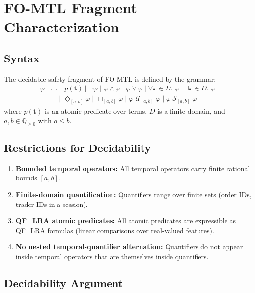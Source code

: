 \documentclass[11pt]{article}
\begin{document}
\section{FO-MTL Fragment Characterization}
\label{app:fotl}

\subsection{Syntax}

The decidable safety fragment of FO-MTL is defined by the grammar:
\begin{align*}
  \varphi &::= p(\mathbf{t}) \mid \neg\varphi \mid \varphi \land \varphi \mid \varphi \lor \varphi \mid \forall x \in D.\; \varphi \mid \exists x \in D.\; \varphi \\
  &\quad\mid \Diamond_{[a,b]} \varphi \mid \Box_{[a,b]} \varphi \mid \varphi\; \mathcal{U}_{[a,b]}\; \varphi \mid \varphi\; \mathcal{S}_{[a,b]}\; \varphi
\end{align*}
where $p(\mathbf{t})$ is an atomic predicate over terms, $D$ is a finite domain, and $a, b \in \mathbb{Q}_{\geq 0}$ with $a \leq b$.

\subsection{Restrictions for Decidability}

\begin{enumerate}[nosep]
  \item \textbf{Bounded temporal operators:} All temporal operators carry finite rational bounds $[a,b]$.
  \item \textbf{Finite-domain quantification:} Quantifiers range over finite sets (order IDs, trader IDs in a session).
  \item \textbf{QF\_LRA atomic predicates:} All atomic predicates are expressible as QF\_LRA formulas (linear comparisons over real-valued features).
  \item \textbf{No nested temporal-quantifier alternation:} Quantifiers do not appear inside temporal operators that are themselves inside quantifiers.
\end{enumerate}

\subsection{Decidability Argument}
\end{document}
